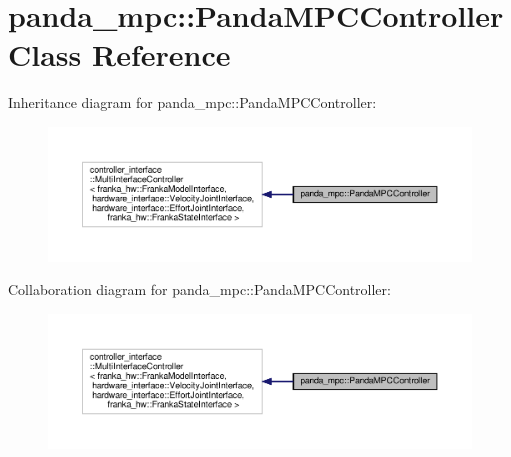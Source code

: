 \hypertarget{classpanda__mpc_1_1_panda_m_p_c_controller}{}\section{panda\+\_\+mpc\+:\+:Panda\+M\+P\+C\+Controller Class Reference}
\label{classpanda__mpc_1_1_panda_m_p_c_controller}


Inheritance diagram for panda\+\_\+mpc\+:\+:Panda\+M\+P\+C\+Controller\+:\nopagebreak
\begin{figure}[H]
\begin{center}
\leavevmode
\includegraphics[width=350pt]{classpanda__mpc_1_1_panda_m_p_c_controller__inherit__graph}
\end{center}
\end{figure}


Collaboration diagram for panda\+\_\+mpc\+:\+:Panda\+M\+P\+C\+Controller\+:\nopagebreak
\begin{figure}[H]
\begin{center}
\leavevmode
\includegraphics[width=350pt]{classpanda__mpc_1_1_panda_m_p_c_controller__coll__graph}
\end{center}
\end{figure}
